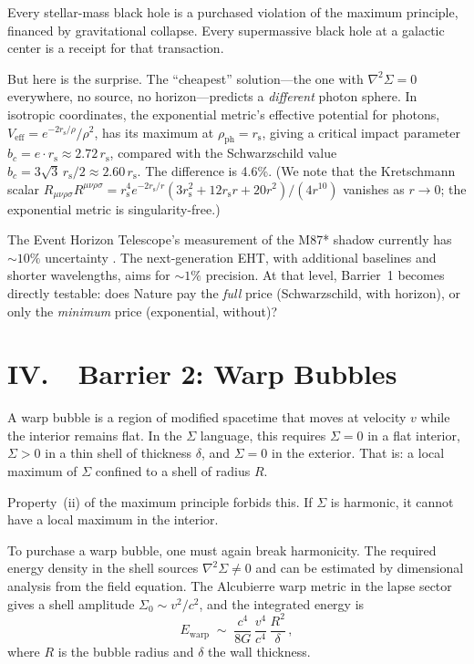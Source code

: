 \documentclass[12pt]{article}
\newcommand{\rs}{r_{\mathrm{s}}}
\begin{document}
Every stellar-mass black hole is a
purchased violation of the maximum principle, financed by
gravitational collapse. Every supermassive black hole at a galactic
center is a receipt for that transaction.

But here is the surprise. The ``cheapest'' solution---the one with
$\nabla^2\Sigma = 0$ everywhere, no source, no horizon---predicts a
\emph{different} photon sphere. In isotropic coordinates, the
exponential metric's effective potential for photons,
$V_{\mathrm{eff}} = e^{-2\rs/\rho}/\rho^2$, has its maximum at
$\rho_{\mathrm{ph}} = \rs$, giving a critical impact parameter
$b_c = e \cdot \rs \approx 2.72\,\rs$, compared with the Schwarzschild
value $b_c = 3\sqrt{3}\,\rs/2 \approx 2.60\,\rs$. The difference is
4.6\%.  (We note that the Kretschmann scalar
$R_{\mu\nu\rho\sigma}R^{\mu\nu\rho\sigma} = \rs^4 e^{-2\rs/r}(3\rs^2
+ 12\rs r + 20 r^2)/(4r^{10})$ vanishes as $r \to 0$; the exponential
metric is singularity-free.)

The Event Horizon Telescope's measurement of the M87* shadow currently
has ${\sim}10\%$ uncertainty \cite{EHT2019}. The next-generation EHT,
with additional baselines and shorter wavelengths, aims for ${\sim}1\%$
precision. At that level, Barrier~1 becomes directly testable: does
Nature pay the \emph{full} price (Schwarzschild, with horizon), or only
the \emph{minimum} price (exponential, without)?


\section*{IV.\ \ Barrier 2: Warp Bubbles}

A warp bubble is a region of modified spacetime that moves at velocity
$v$ while the interior remains flat. In the $\Sigma$ language, this
requires $\Sigma = 0$ in a flat interior, $\Sigma > 0$ in a thin shell
of thickness $\delta$, and $\Sigma = 0$ in the exterior. That is: a
local maximum of $\Sigma$ confined to a shell of radius $R$.

Property~(ii) of the maximum principle forbids this. If $\Sigma$ is
harmonic, it cannot have a local maximum in the interior.

To purchase a warp bubble, one must again break harmonicity. The
required energy density in the shell sources $\nabla^2\Sigma \neq 0$
and can be estimated by dimensional analysis from the field equation.
The Alcubierre warp metric \cite{Alcubierre1994} in the lapse sector
gives a shell amplitude $\Sigma_0 \sim v^2/c^2$, and the integrated
energy is
\begin{equation}
E_{\mathrm{warp}} \;\sim\;
\frac{c^4}{8G}\,\frac{v^4}{c^4}\,\frac{R^2}{\delta}\,,
\label{eq:warp}
\end{equation}
where $R$ is the bubble radius and $\delta$ the wall thickness.
\end{document}
